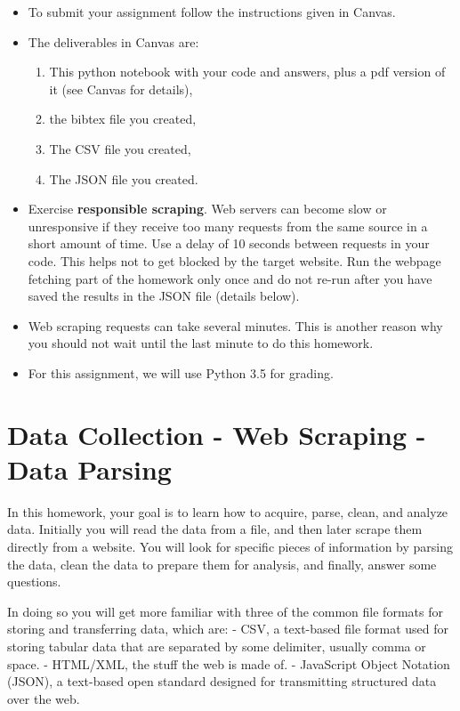 \documentclass[11pt]{article}
\providecommand{\tightlist}{%
      \setlength{\itemsep}{0pt}\setlength{\parskip}{0pt}}
\begin{document}
\begin{itemize}
\tightlist
\item
  To submit your assignment follow the instructions given in Canvas.
\item
  The deliverables in Canvas are:

  \begin{enumerate}
  \def\labelenumi{\alph{enumi})}
  \tightlist
  \item
    This python notebook with your code and answers, plus a pdf version
    of it (see Canvas for details),
  \item
    the bibtex file you created, 
  \item
    The CSV file you created, 
  \item
    The JSON file you created. 
  \end{enumerate}
\item
  Exercise \textbf{responsible scraping}. Web servers can become slow or
  unresponsive if they receive too many requests from the same source in
  a short amount of time. Use a delay of 10 seconds between requests in
  your code. This helps not to get blocked by the target website. Run
  the webpage fetching part of the homework only once and do not re-run
  after you have saved the results in the JSON file (details below).
\item
  Web scraping requests can take several minutes. This is another reason
  why you should not wait until the last minute to do this homework.
\item
  For this assignment, we will use Python 3.5 for grading.
\end{itemize}

\section{Data Collection - Web Scraping - Data
Parsing}\label{data-collection---web-scraping---data-parsing}

In this homework, your goal is to learn how to acquire, parse, clean,
and analyze data. Initially you will read the data from a file, and then
later scrape them directly from a website. You will look for specific
pieces of information by parsing the data, clean the data to prepare
them for analysis, and finally, answer some questions.

In doing so you will get more familiar with three of the common file
formats for storing and transferring data, which are: - CSV, a
text-based file format used for storing tabular data that are separated
by some delimiter, usually comma or space. - HTML/XML, the stuff the web
is made of. - JavaScript Object Notation (JSON), a text-based open
standard designed for transmitting structured data over the web.
\end{document}
